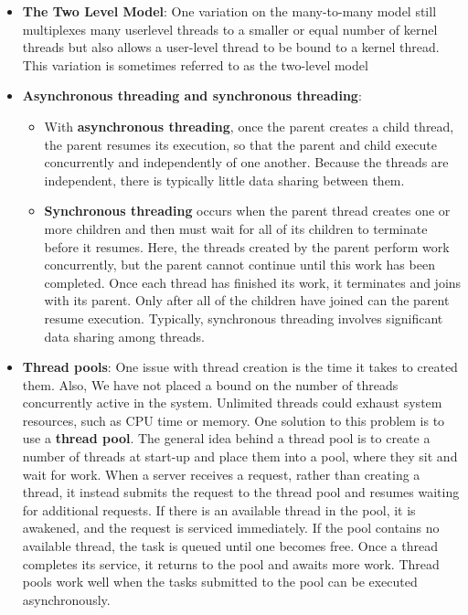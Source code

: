 \documentclass{report}
\begin{document}
\begin{itemize}
\begin{enumerate}
            \end{enumerate}

        \item \textbf{The Two Level Model}: One variation on the many-to-many model still multiplexes many userlevel threads to a smaller or equal number of kernel threads but also allows a user-level thread to be bound to a kernel thread. This variation is sometimes referred to as the two-level model
        \item \textbf{Asynchronous threading and synchronous threading}: 
            \begin{itemize}
                \item With \textbf{asynchronous threading}, once the parent creates a child thread, the parent resumes its execution, so that the parent and child execute concurrently and independently of one another. Because the threads are independent, there is typically little data sharing between them. 
                \item \textbf{Synchronous threading} occurs when the parent thread creates one or more children and then must wait for all of its children to terminate before it resumes. Here, the threads created by the parent perform work concurrently, but the parent cannot continue until this work has been completed. Once each thread has finished its work, it terminates and joins with its parent. Only after all of the children have joined can the parent resume execution. Typically, synchronous threading involves significant data sharing among threads.
            \end{itemize}
        \item \textbf{Thread pools}: One issue with thread creation is the time it takes to created them. Also, We have not placed a bound on the number of threads concurrently active in the system. Unlimited threads could exhaust system resources, such as CPU time or memory. One solution to this problem is to use a \textbf{thread pool}.
            \bigbreak \noindent 
            The general idea behind a thread pool is to create a number of threads at start-up and place them into a pool, where they sit and wait for work. When a server receives a request, rather than creating a thread, it instead submits the request to the thread pool and resumes waiting for additional requests.
            \bigbreak \noindent 
            If there is an available thread in the pool, it is awakened, and the request is serviced immediately. If the pool contains no available thread, the task is queued until one becomes free. Once a thread completes its service, it returns to the pool and awaits more work. Thread pools work well when the tasks submitted to the pool can be executed asynchronously.

\end{itemize}
\end{document}
